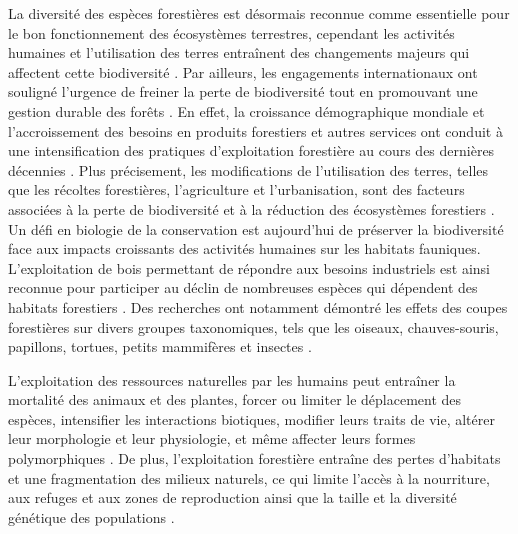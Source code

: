 La diversité des espèces forestières est désormais reconnue comme essentielle pour le bon fonctionnement des écosystèmes terrestres, cependant les activités humaines et l'utilisation des terres entraînent des changements majeurs qui affectent cette biodiversité \citep{Newbold2015Globaleffects}.
Par ailleurs, les engagements internationaux ont souligné l'urgence de freiner la perte de biodiversité tout en promouvant une gestion durable des forêts \citep{Scherer-Lorenzen2005ForestDiversity,Parviainen2007Maintenanceconservation}. 
En effet, la croissance démographique mondiale et l'accroissement des besoins en produits forestiers et autres services ont conduit à une intensification des pratiques d'exploitation forestière au cours des dernières décennies \citep{Foley2005GlobalConsequences}. 
Plus précisement, les modifications de l'utilisation des terres, telles que les récoltes forestières, l'agriculture et l'urbanisation, sont des facteurs associées à la perte de biodiversité et à la réduction des écosystèmes forestiers \citep{Sala2000Globalbiodiversity,Naeem2012functionsbiological,Bichet2016Maintaininganimal}.
Un défi en biologie de la conservation est aujourd'hui de préserver la biodiversité face aux impacts croissants des activités humaines sur les habitats fauniques. 
L'exploitation de bois permettant de répondre aux besoins industriels est ainsi reconnue pour participer au déclin de nombreuses espèces qui dépendent des habitats forestiers \citep{Bengtsson2000Biodiversitydisturbances}. 
Des recherches ont notamment démontré les effets des coupes forestières sur divers groupes taxonomiques, tels que les oiseaux, chauves-souris, papillons, tortues, petits mammifères et insectes \citep{Summerville2011Managingforest,Currylow2012ShortTermForest,Kaminski2013EffectsForest,Kellner2013Shorttermresponses,Caldwell2019ComparisonBat}.


L'exploitation des ressources naturelles par les humains peut entraîner la mortalité des animaux et des plantes, forcer ou limiter le déplacement des espèces, intensifier les interactions biotiques, modifier leurs traits de vie, altérer leur morphologie et leur physiologie, et même affecter leurs formes polymorphiques \citep{Sergio2018Animalresponses}. 
De plus, l'exploitation forestière entraîne des pertes d'habitats et une fragmentation des milieux naturels, ce qui limite l'accès à la nourriture, aux refuges et aux zones de reproduction ainsi que la taille et la diversité génétique des populations \citep{Coelho2020Effectsanthropogenic}.


